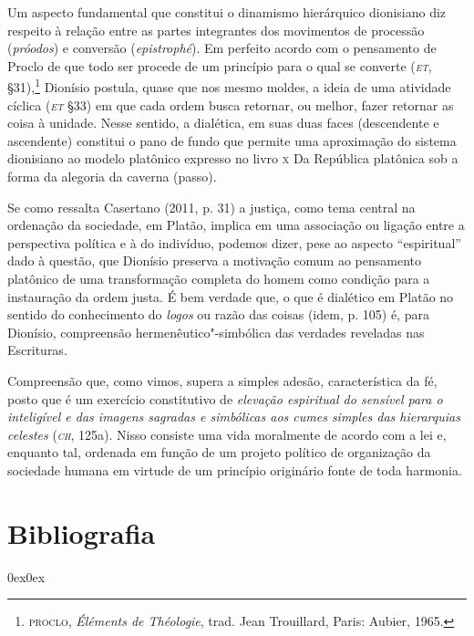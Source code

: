 {Um aspecto fundamental que constitui o dinamismo hierárquico
dionisiano diz respeito à relação entre as partes integrantes dos
movimentos de processão (\emph{próodos}) e conversão
(\emph{epistrophé}). Em perfeito acordo com o pensamento de Proclo de
que todo ser procede de um princípio para o qual se converte
(\emph{\textsc{et}}, §31),\footnote{ \textsc{proclo}, \emph{Éléments de Théologie},
trad. Jean Trouillard, Paris: Aubier, 1965.} Dionísio postula,
quase que nos mesmo moldes, a ideia de uma atividade cíclica
(\emph{\textsc{et}} §33) em que cada ordem busca retornar, ou melhor, fazer
retornar as coisa à unidade. Nesse sentido, a dialética, em suas duas
faces (descendente e ascendente) constitui o pano de fundo que permite
uma aproximação do sistema dionisiano ao modelo platônico expresso no
livro \textsc{x} Da República platônica sob a forma da alegoria da caverna
(passo). 

Se como ressalta Casertano (2011, p. 31) a justiça, como tema
central na ordenação da sociedade, em Platão, implica em uma associação
ou ligação entre a perspectiva política e à do indivíduo, podemos
dizer, pese ao aspecto “espiritual” dado à questão, que Dionísio
preserva a motivação comum ao pensamento platônico de uma transformação
completa do homem como condição para a instauração da ordem justa. É
bem verdade que, o que é dialético em Platão no sentido do conhecimento
do \emph{logos }ou razão das coisas (idem, p. 105) é, para Dionísio,
compreensão hermenêutico"-simbólica das verdades reveladas nas
Escrituras. 

Compreensão que, como vimos, supera a simples adesão\emph{,}
característica da fé, posto que é um exercício constitutivo de
\emph{elevação espiritual do sensível para o inteligível e das
imagens sagradas e simbólicas aos cumes simples das hierarquias
celestes} (\emph{\textsc{ch}}, 125a). Nisso consiste uma vida moralmente de
acordo com a lei e, enquanto tal, ordenada em função de um projeto
político de organização da sociedade humana em virtude de um princípio
originário fonte de toda harmonia.



\section{Bibliografia}
\begin{description}0ex\parsep0ex
\newcommand{\tit}[1]{\item[\textnormal{\textsc{\MakeTextLowercase{#1}}}]}
\newcommand{\titidem}{\item[\line(1,0){25}]}


\end{description}}
